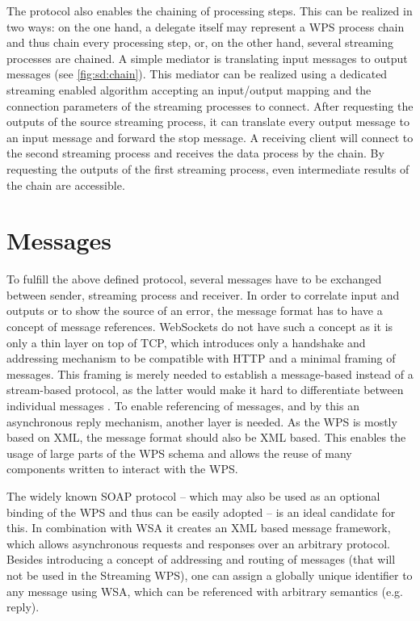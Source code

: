   The protocol also enables the chaining of processing steps. This can be realized in two ways: on the one hand, a delegate itself may represent a \ac{WPS} process chain and thus chain every processing step, or, on the other hand, several streaming processes are chained. A simple mediator is translating input messages to output messages (see \cref{fig:sd:chain}). This mediator can be realized using a dedicated streaming enabled algorithm accepting an input/output mapping and the connection parameters of the streaming processes to connect. After requesting the outputs of the source streaming process, it can translate every output message to an input message and forward the stop message. A receiving client will connect to the second streaming process and receives the data process by the chain. By requesting the outputs of the first streaming process, even intermediate results of the chain are accessible.

\section{Messages}
  \label{sec:streaming:messages}
  To fulfill the above defined protocol, several messages have to be exchanged between sender, streaming process and receiver. In order to correlate input and outputs or to show the source of an error, the message format has to have a concept of message references. WebSockets do not have such a concept as it is only a thin layer on top of TCP, which introduces only a handshake and addressing mechanism to be compatible with HTTP and a minimal framing of messages. This framing is merely needed to establish a message-based instead of a stream-based protocol, as the latter would make it hard to differentiate between individual messages \citep{ietf:rfc6455}. To enable referencing of messages, and by this an asynchronous reply mechanism, another layer is needed. As the \ac{WPS} is mostly based on \ac{XML}, the message format should also be \ac{XML} based. This enables the usage of large parts of the \ac{WPS} schema and allows the reuse of many components written to interact with the \ac{WPS}.

  The widely known SOAP protocol \citep{w3c:soap1} -- which may also be used as an optional binding of the \ac{WPS} \citep{ogc:wps} and thus can be easily adopted -- is an ideal candidate for this. In combination with \ac{WSA} \citep{w3c:wsa} it creates an \ac{XML} based message framework, which allows asynchronous requests and responses over an arbitrary protocol. Besides introducing a concept of addressing and routing of messages (that will not be used in the Streaming \ac{WPS}), one can assign a globally unique identifier to any message using \ac{WSA}, which can be referenced with arbitrary semantics (e.g. reply).

